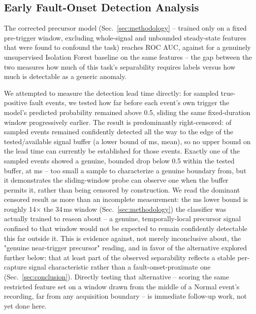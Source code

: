 \subsection{Early Fault-Onset Detection Analysis}

The corrected precursor model (Sec.~\ref{sec:methodology} -- trained only on a fixed pre-trigger window, excluding whole-signal and unbounded steady-state features that were found to confound the task) reaches \MetricZeroFivePhaseZeroPrecursorRandomForestRocAuc{} ROC AUC, against \MetricZeroFivePrecursorWindowLeakInvestigationTruePrecursorIsolationForestAuc{} for a genuinely unsupervised Isolation Forest baseline on the same features -- the gap between the two measures how much of this task's separability requires labels versus how much is detectable as a generic anomaly.

We attempted to measure the detection lead time directly: for \MetricZeroFivePrecursorLeadTimeNEventsTotal{} sampled true-positive fault events, we tested how far before each event's own trigger the model's predicted probability remained above 0.5, %
sliding the same fixed-duration window progressively earlier. The result is predominantly right-censored: \MetricZeroFivePrecursorLeadTimeCensoredFraction{} of sampled events remained confidently detected all the way to the edge of the tested/available signal buffer (a lower bound of \MetricZeroFivePrecursorLeadTimeLeadTimeMsLowerBoundMeanCensored{}ms, mean), so no upper bound on the lead time can currently be established for those events. Exactly one of the \MetricZeroFivePrecursorLeadTimeNEventsTotal{} sampled events showed a genuine, bounded drop below 0.5 within the tested buffer, at \MetricZeroFivePrecursorLeadTimeLeadTimeMsMeanUncensored{}ms -- too small a sample to characterize a genuine boundary from, but it demonstrates the sliding-window probe can observe one when the buffer permits it, rather than being censored by construction. We read the dominant censored result as more than an incomplete measurement: the \MetricZeroFivePrecursorLeadTimeLeadTimeMsLowerBoundMeanCensored{}ms lower bound is roughly 14$\times$ the 34\,ms window (Sec.~\ref{sec:methodology}) %
the classifier was actually trained to reason about -- a genuine, temporally-local precursor signal confined to that window would not be expected to remain confidently detectable this far outside it. This is evidence against, not merely inconclusive about, the "genuine near-trigger precursor" reading, and in favor of the alternative explored further below: that at least part of the observed separability reflects a stable per-capture signal characteristic rather than a fault-onset-proximate one (Sec.~\ref{sec:conclusion}). Directly testing that alternative -- scoring the same restricted feature set on a window drawn from the middle of a Normal event's recording, far from any acquisition boundary -- is immediate follow-up work, not yet done here.

